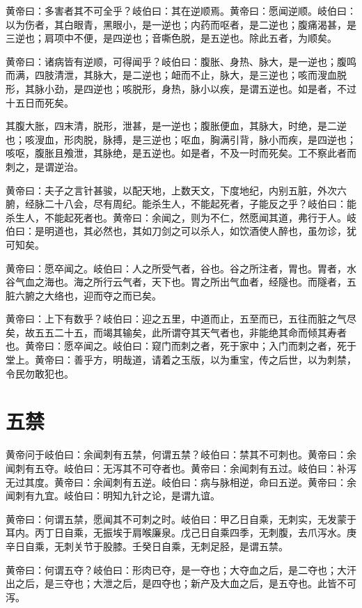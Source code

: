 \documentclass[a4paper,12pt,UTF8,twoside]{ctexbook}
\begin{document}
	黄帝曰：多害者其不可全乎？岐伯曰：其在逆顺焉。黄帝曰：愿闻逆顺。岐伯曰：以为伤者，其白眼青，黑眼小，是一逆也；内药而呕者，是二逆也；腹痛渴甚，是三逆也；肩项中不便，是四逆也；音嘶色脱，是五逆也。除此五者，为顺矣。
	
	黄帝曰：诸病皆有逆顺，可得闻乎？岐伯曰：腹胀、身热、脉大，是一逆也；腹鸣而满，四肢清泄，其脉大，是二逆也；衄而不止，脉大，是三逆也；咳而溲血脱形，其脉小劲，是四逆也；咳脱形，身热，脉小以疾，是谓五逆也。如是者，不过十五日而死矣。
	
	其腹大胀，四末清，脱形，泄甚，是一逆也；腹胀便血，其脉大，时绝，是二逆也；咳溲血，形肉脱，脉搏，是三逆也；呕血，胸满引背，脉小而疾，是四逆也；咳呕，腹胀且飧泄，其脉绝，是五逆也。如是者，不及一时而死矣。工不察此者而刺之，是谓逆治。
	
	黄帝曰：夫子之言针甚骏，以配天地，上数天文，下度地纪，内别五脏，外次六腑，经脉二十八会，尽有周纪。能杀生人，不能起死者，子能反之乎？岐伯曰：能杀生人，不能起死者也。黄帝曰：余闻之，则为不仁，然愿闻其道，弗行于人。岐伯曰：是明道也，其必然也，其如刀剑之可以杀人，如饮酒使人醉也，虽勿诊，犹可知矣。
	
	黄帝曰：愿卒闻之。岐伯曰：人之所受气者，谷也。谷之所注者，胃也。胃者，水谷气血之海也。海之所行云气者，天下也。胃之所出气血者，经隧也。而隧者，五脏六腑之大络也，迎而夺之而已矣。
	
	黄帝曰：上下有数乎？岐伯曰：迎之五里，中道而止，五至而已，五往而脏之气尽矣，故五五二十五，而竭其输矣，此所谓夺其天气者也，非能绝其命而倾其寿者也。黄帝曰：愿卒闻之。岐伯曰：窥门而刺之者，死于家中；入门而刺之者，死于堂上。黄帝曰：善乎方，明哉道，请着之玉版，以为重宝，传之后世，以为刺禁，令民勿敢犯也。
	\chapter{五禁}
	
	黄帝问于岐伯曰：余闻刺有五禁，何谓五禁？岐伯曰：禁其不可刺也。黄帝曰：余闻刺有五夺。岐伯曰：无泻其不可夺者也。黄帝曰：余闻刺有五过。岐伯曰：补泻无过其度。黄帝曰：余闻刺有五逆。岐伯曰：病与脉相逆，命曰五逆。黄帝曰：余闻刺有九宜。岐伯曰：明知九针之论，是谓九谊。
	
	黄帝曰：何谓五禁，愿闻其不可刺之时。岐伯曰：甲乙日自乘，无刺实，无发蒙于耳内。丙丁日自乘，无振埃于肩喉廉泉。戊己日自乘四季，无刺腹，去爪泻水。庚辛日自乘，无刺关节于股膝。壬癸日自乘，无刺足胫，是谓五禁。
	
	黄帝曰：何谓五夺？岐伯曰：形肉已夺，是一夺也；大夺血之后，是二夺也；大汗出之后，是三夺也；大泄之后，是四夺也；新产及大血之后，是五夺也。此皆不可泻。
	
\end{document}
